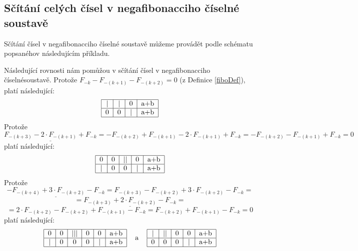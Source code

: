 \documentclass[czech,bachelor,dept470,male]{diploma}
\begin{document}
\subsection{Sčítání celých čísel v negafibonacciho číselné soustavě}
Sčítání čísel v negafibonacciho číselné soustavě můžeme provádět podle schématu popsaného\newline v následujícím příkladu.
\begin{remark}
	Následující rovnosti nám pomůžou v sčítání čísel v negafibonacciho číselné\newline soustavě.
	Protože $F_{-k}-F_{-(k+1)}-F_{-(k+2)}=0$ (z Definice \ref{fiboDef}), platí následující:
	\begin{equation}\label{fiboAddA}
		\begin{tabular}{|c|c|c|c|c|c|}
			\hline
			| & | & 0 & a+b \\ \hline
			0 & 0 & | & a+b \\
			\hline
		\end{tabular}
	\end{equation}
	Protože $$\underline{F_{-(k+3)}-2\cdot F_{-(k+1)}+F_{-k}}=-F_{-(k+2)}+F_{-(k+1)}-2\cdot F_{-(k+1)}+F_{-k}=-F_{-(k+2)}-F_{-(k+1)}+F_{-k}=0$$platí následující:
	\begin{equation}\label{fiboAddB}
		\begin{tabular}{|c|c|c|c|c|}
			\hline
			0 & 0 & || & 0 & a+b \\ \hline
			| & 0 & 0  & | & a+b \\
			\hline
		\end{tabular}
	\end{equation}
	Protože $$\underline{-F_{-(k+4)}+3\cdot F_{-(k+2)}-F_{-k}}=F_{-(k+3)}-F_{-(k+2)}+3\cdot F_{-(k+2)}-F_{-k}=$$$$=\underline{F_{-(k+3)}+2\cdot F_{-(k+2)}-F_{-k}}=$$$$=2\cdot F_{-(k+2)}-F_{-(k+2)}+F_{-(k+1)}-F_{-k}=F_{-(k+2)}+F_{-(k+1)}-F_{-k}=0$$platí následující:
	\begin{equation}\label{fiboAddC}
		\begin{tabular}{ccc}
			\begin{tabular}{|c|c|c|c|c|c|}
				\hline
				0 & 0 & ||| & 0 & 0 & a+b \\ \hline
				| & 0 & 0   & 0 & | & a+b \\
				\hline
			\end{tabular}
			 & a &
			\begin{tabular}{|c|c|c|c|c|}
				\hline
				| & || & 0 & 0 & a+b \\ \hline
				0 & 0  & 0 & | & a+b \\
				\hline
			\end{tabular}
		\end{tabular}
	\end{equation}
\end{remark}
\end{document}
